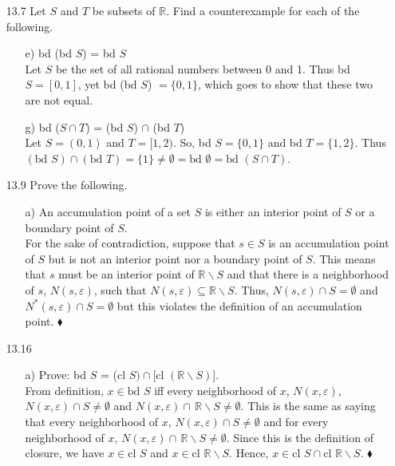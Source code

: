 \documentclass[12pt]{article}
\begin{document}
\begin{enumerate}
\item[13.7] Let $S$ and $T$ be subsets of $\mathbb{R}$. Find a counterexample for each of the following.
\begin{enumerate}
\item[e)] bd (bd $S$) = bd $S$ \\
Let $S$ be the set of all rational numbers between 0 and 1. Thus bd $S = [0, 1]$, yet
bd (bd $S$) $= \{0, 1\}$, which goes to show that these two are not equal.
\item[g)] bd ($S \cap T$) = (bd $S$) $\cap$ (bd $T$) \\
Let $S = (0, 1)$ and $T = [1, 2)$. So, bd $S = \{0, 1\}$ and bd $T = \{1, 2\}$. Thus
$(\mbox{bd } S) \cap (\mbox{bd } T) = \{1\} \neq \emptyset = \mbox{bd }\emptyset = \mbox{bd }(S \cap T)$.
\end{enumerate}

\item[13.9] Prove the following.
\begin{enumerate}
\item[a)] An accumulation point of a set $S$ is either an interior point of $S$ or a boundary point of $S$. \\
For the sake of contradiction, suppose that $s \in S$ is an accumulation point of $S$ but is not an interior point nor a boundary point of $S$. This means that $s$ must be an interior point of $\mathbb{R}\backslash S$ and that there is a neighborhood of $s$, $N(s, \varepsilon )$, such that $N(s, \varepsilon ) \subseteq \mathbb{R}\backslash S$. Thus, $N(s, \varepsilon ) \cap S = \emptyset$ and $N^*(s, \varepsilon ) \cap S = \emptyset$ but this violates the definition of an accumulation point.
$\blacklozenge$
\end{enumerate}

\item[13.16] 
\begin{enumerate}
\item[a)] Prove: bd $S$ = (cl $S) \cap [$cl $(\mathbb{R}\backslash S)]$. \\
From definition, $x \in \mbox{bd } S$ iff every neighborhood of $x$, $N(x, \varepsilon)$, 
$N(x, \varepsilon) \cap S \neq \emptyset$ and $N(x, \varepsilon) \cap \,\mathbb{R}\backslash S 
\neq \emptyset$. This is the same as saying that every neighborhood of $x$, 
$N(x, \varepsilon) \cap S \neq \emptyset$ and for every neighborhood of $x$, 
$N(x, \varepsilon) \cap \,\mathbb{R}\backslash S \neq \emptyset$. Since this is the definition of
closure, we have $x \in \mbox{cl }S$ and $x \in \mbox{cl }\mathbb{R}\backslash S$. Hence, 
$x \in \mbox{cl }S \cap \mbox{cl }\mathbb{R}\backslash S$. $\blacklozenge$


\end{enumerate}
\end{enumerate}
\end{document}
